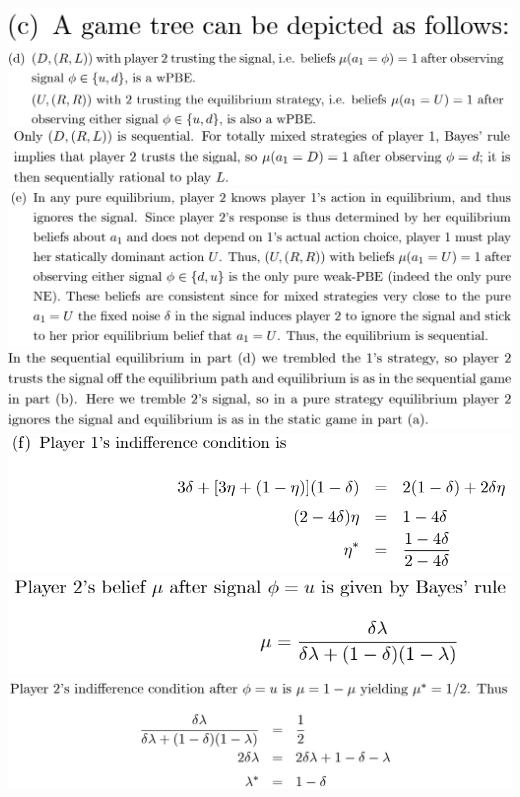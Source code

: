 \documentclass[8pt,landscape]{extarticle}
\begin{document}
\begin{multicols*}{3}
    \includegraphics[width=0.36\linewidth,keepaspectratio]{Screenshots/Screenshot 2024-03-11 133447.png}
    \includegraphics[width=0.74\linewidth,keepaspectratio]{Screenshots/Screenshot 2024-03-11 133455.png}
    \includegraphics[width=0.71\linewidth,keepaspectratio]{Screenshots/Screenshot 2024-03-11 133503.png}
    \includegraphics[width=0.73\linewidth,keepaspectratio]{Screenshots/Screenshot 2024-03-11 133508.png}
    \includegraphics[width=0.7\linewidth,keepaspectratio]{Screenshots/Screenshot 2024-03-11 133513.png}
    \includegraphics[width=0.58\linewidth,keepaspectratio]{Screenshots/Screenshot 2024-03-11 133524.png}
    \includegraphics[width=0.51\linewidth,keepaspectratio]{Screenshots/Screenshot 2024-03-11 133527.png}
    \includegraphics[width=0.69\linewidth,keepaspectratio]{Screenshots/Screenshot 2024-03-11 133531.png}

\end{multicols*}
\end{document}
